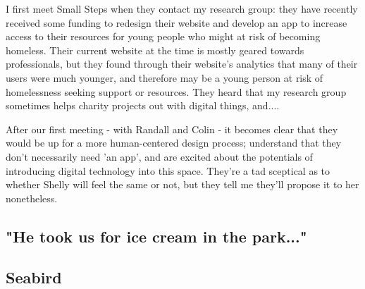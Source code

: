 I first meet Small Steps when they contact my research group: they have recently received some funding to redesign their website and develop an app to increase access to their resources for young people who might at risk of becoming homeless. Their current website at the time is mostly geared towards professionals, but they found through their website's analytics that many of their users were much younger, and therefore may be a young person at risk of homelessness seeking support or resources. They heard that my research group sometimes helps charity projects out with digital things, and....


 After our first meeting - with Randall and Colin - it becomes clear that they would be up for a more human-centered design process; understand that they don't necessarily need 'an app', and are excited about the potentials of introducing digital technology into this space. They're a tad sceptical as to whether Shelly will feel the same or not, but they tell me they'll propose it to her nonetheless.




\subsection{"He took us for ice cream in the park..."}





\subsection{Seabird}

